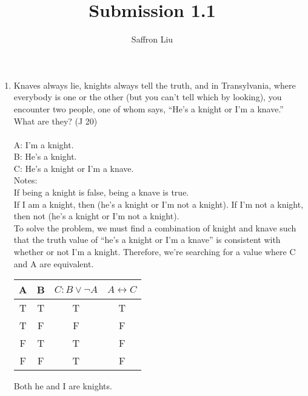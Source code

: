 \documentclass{article}
\title{Submission 1.1}
\author{Saffron Liu}
\date{}
\begin{document}
\maketitle

\begin{enumerate}
      \item Knaves always lie, knights always tell the truth, and in Transylvania, where everybody is one or the other (but you can't tell which by looking), you encounter two people, one of whom says, “He's a knight or I'm a knave.” What are they? (J 20)\\\\
            A: I'm a knight.\\
            B: He's a knight.\\
            C: He's a knight or I'm a knave.\\
            Notes:\\
            If being a knight is false, being a knave is true.\\
            If I am a knight, then (he's a knight or I'm not a knight). If I'm not a knight, then not (he's a knight or I'm not a knight).\\
            To solve the problem, we must find a combination of knight and knave such that the truth value of “he's a knight or I'm a knave” is consistent with whether or not I'm a knight. Therefore, we're searching for a value where C and A are equivalent.\\
            \begin{tabular}{c|c|c|c}
                  A & B & $C: B \lor \neg A$ & $A \leftrightarrow C$ \\
                  \hline
                  T & T & T                  & T                     \\
                  \rowcolor{lightgray} T & F & F                  & F                     \\
                  \rowcolor{lightgray} F & T & T                  & F                     \\
                  \rowcolor{lightgray} F & F & T                  & F                     \\
            \end{tabular}
            Both he and I are knights.
\end{enumerate}
\end{document}

